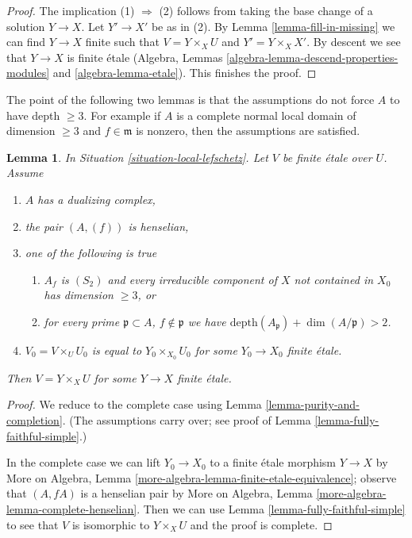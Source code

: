 \documentclass{stacks-project}
\theoremstyle{plain}
\newtheorem{lemma}[subsection]{Lemma}
\theoremstyle{definition}
\theoremstyle{remark}
\numberwithin{equation}{subsection}
\begin{document}
\begin{proof}
The implication (1) $\Rightarrow$ (2) follows from taking the base change
of a solution $Y \to X$. Let $Y' \to X'$ be as in (2).
By Lemma \ref{lemma-fill-in-missing} we can find $Y \to X$ finite
such that $V = Y \times_X U$ and $Y' = Y \times_X X'$.
By descent we see that $Y \to X$ is finite \'etale
(Algebra, Lemmas \ref{algebra-lemma-descend-properties-modules} and
\ref{algebra-lemma-etale}). This finishes the proof.
\end{proof}

\noindent
The point of the following two lemmas is that the assumptions do not force
$A$ to have depth $\geq 3$. For example if $A$ is a complete normal
local domain of dimension $\geq 3$ and $f \in \mathfrak m$ is nonzero,
then the assumptions are satisfied.

\begin{lemma}
\label{lemma-lift-simple}
In Situation \ref{situation-local-lefschetz}. Let $V$ be finite
\'etale over $U$. Assume
\begin{enumerate}
\item[(a)] $A$ has a dualizing complex,
\item[(b)] the pair $(A, (f))$ is henselian,
\item[(c)] one of the following is true
\begin{enumerate}
\item[(i)] $A_f$ is $(S_2)$ and every irreducible component of $X$
not contained in $X_0$ has dimension $\geq 3$, or
\item[(ii)] for every prime $\mathfrak p \subset A$, $f \not \in \mathfrak p$
we have $\text{depth}(A_\mathfrak p) + \dim(A/\mathfrak p) > 2$.
\end{enumerate}
\item[(d)] $V_0 = V \times_U U_0$ is equal to $Y_0 \times_{X_0} U_0$
for some $Y_0 \to X_0$ finite \'etale.
\end{enumerate}
Then $V = Y \times_X U$ for some $Y \to X$ finite \'etale.
\end{lemma}

\begin{proof}
We reduce to the complete case using Lemma \ref{lemma-purity-and-completion}.
(The assumptions carry over; see proof of
Lemma \ref{lemma-fully-faithful-simple}.)

\medskip\noindent
In the complete case we can lift $Y_0 \to X_0$ to a finite \'etale
morphism $Y \to X$ by
More on Algebra, Lemma \ref{more-algebra-lemma-finite-etale-equivalence};
observe that $(A, fA)$ is a henselian pair by
More on Algebra, Lemma \ref{more-algebra-lemma-complete-henselian}.
Then we can use Lemma \ref{lemma-fully-faithful-simple}
to see that $V$ is isomorphic to $Y \times_X U$ and
the proof is complete.
\end{proof}
\end{document}
